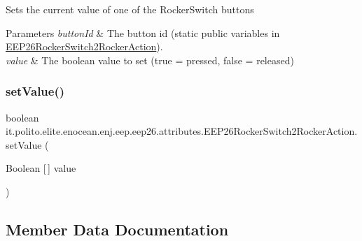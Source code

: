 Sets the current value of one of the Rocker\+Switch buttons


\begin{DoxyParams}{Parameters}
{\em button\+Id} & The button id (static public variables in \hyperlink{classit_1_1polito_1_1elite_1_1enocean_1_1enj_1_1eep_1_1eep26_1_1attributes_1_1_e_e_p26_rocker_switch2_rocker_action}{E\+E\+P26\+Rocker\+Switch2\+Rocker\+Action}). \\
\hline
{\em value} & The boolean value to set (true = pressed, false = released) \\
\hline
\end{DoxyParams}
\hypertarget{classit_1_1polito_1_1elite_1_1enocean_1_1enj_1_1eep_1_1eep26_1_1attributes_1_1_e_e_p26_rocker_switch2_rocker_action_a7a7b41f357aa3643f55f934c61d41d84}{}\label{classit_1_1polito_1_1elite_1_1enocean_1_1enj_1_1eep_1_1eep26_1_1attributes_1_1_e_e_p26_rocker_switch2_rocker_action_a7a7b41f357aa3643f55f934c61d41d84} 
\subsubsection{\texorpdfstring{set\+Value()}{setValue()}}
{\footnotesize\ttfamily boolean it.\+polito.\+elite.\+enocean.\+enj.\+eep.\+eep26.\+attributes.\+E\+E\+P26\+Rocker\+Switch2\+Rocker\+Action.\+set\+Value (\begin{DoxyParamCaption}\item[{Boolean \mbox{[}$\,$\mbox{]}}]{value }\end{DoxyParamCaption})}



\subsection{Member Data Documentation}
\hypertarget{classit_1_1polito_1_1elite_1_1enocean_1_1enj_1_1eep_1_1eep26_1_1attributes_1_1_e_e_p26_rocker_switch2_rocker_action_ac3e7aebcc415e9d15f73c2d6c1c36016}{}\label{classit_1_1polito_1_1elite_1_1enocean_1_1enj_1_1eep_1_1eep26_1_1attributes_1_1_e_e_p26_rocker_switch2_rocker_action_ac3e7aebcc415e9d15f73c2d6c1c36016} 
